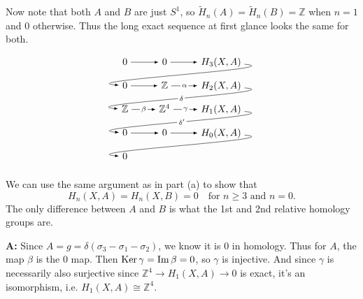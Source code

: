 \documentclass[twoside,10pt]{article}
\begin{document}
\begin{enumerate}
		Now note that both $A$ and $B$ are just $S^{1}$, so $\tilde{H}_{n}(A)=\tilde{H}_{n}(B) = \mathbb{Z}$ when $n=1$ and 0 otherwise. Thus the long exact sequence at first glance looks the same for both.
		\[
                \begin{tikzpicture}[descr/.style={fill=white,inner sep=1.5pt}]
                        \matrix (m) [                            matrix of math nodes,
                            row sep=1em,
                            column sep=2.5em,
                            text height=1.5ex, text depth=0.25ex
                        ]
                        {
                                0 & 0 & H_{3}(X,A) \\
                                0 & \mathbb{Z} & H_{2}(X,A) \\
                                \mathbb{Z} & \mathbb{Z}^{4} & H_{1}(X,A) \\
                                0 & 0 & H_{0}(X,A) \\
                                0 \\
                        };
                        \path[overlay,->, font=\scriptsize,>=latex]
                        (m-1-1) edge (m-1-2)
                        (m-1-2) edge (m-1-3)
                        (m-1-3) edge[out=355,in=175] (m-2-1)
                        (m-2-1) edge (m-2-2)
			(m-2-2) edge node[descr]{$\alpha$} (m-2-3)
			(m-2-3) edge[out=355,in=175] node[descr]{$\delta$} (m-3-1)
			(m-3-1) edge node[descr]{$\beta$} (m-3-2)
                        (m-3-2) edge node[descr]{$\gamma$} (m-3-3)
                        (m-3-3) edge[out=355,in=175] node[descr]{$\delta'$} (m-4-1)
                        (m-4-1) edge (m-4-2)
                        (m-4-2) edge (m-4-3)
                        (m-4-3) edge[out=355,in=175] (m-5-1);
                \end{tikzpicture}
                \]
		We can use the same argument as in part (a) to show that
		\[
			H_{n}(X,A) = H_{n}(X,B) = 0 \quad \text{for } n \geq 3 \text{ and } n=0.
		\] The only difference between $A$ and $B$ is what the 1st and 2nd relative homology groups are.

		\textbf{A:} Since $A = g = \delta(\sigma_3-\sigma_1-\sigma_2)$, we know it is 0 in homology. Thus for $A$, the map $\beta$ is the 0 map. Then $\operatorname{Ker} \gamma = \operatorname{Im} \beta = 0$, so $\gamma$ is injective. And since $\gamma$ is necessarily also surjective since $\mathbb{Z}^{4}\to H_1(X,A)\to 0$ is exact, it's an isomorphism, i.e. $H_1(X,A) \cong \mathbb{Z}^{4}$.


\end{enumerate}
\end{document}
